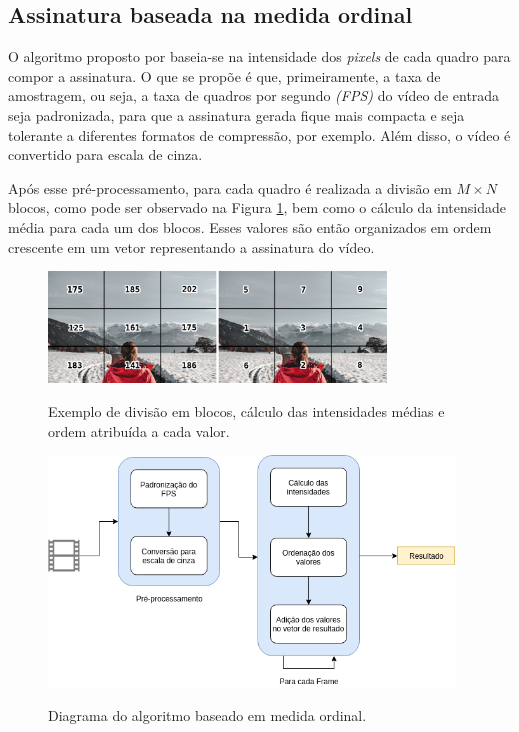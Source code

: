 %
%
\subsection{Assinatura baseada na medida ordinal}
\label{sec:med_ordinal}

	O algoritmo proposto por \citeauthor{hua2004robust} baseia-se na intensidade dos \textit{pixels} de cada quadro para compor a assinatura. O que se propõe é que, primeiramente, a taxa de amostragem, ou seja, a taxa de quadros por segundo \textit{(FPS)} do vídeo de entrada seja padronizada, para que a assinatura gerada fique mais compacta e seja tolerante a diferentes formatos de compressão, por exemplo. Além disso, o vídeo é convertido para escala de cinza.

Após esse pré-processamento, para cada quadro é realizada a divisão em $M \times N$ blocos, como pode ser observado na Figura \ref{fig:medidaord}, bem como o cálculo da intensidade média para cada um dos blocos. Esses valores são então organizados em ordem crescente em um vetor representando a assinatura do vídeo.

	\begin{figure}[!htb]
        \centering
        \caption{Exemplo de divisão em blocos, cálculo das intensidades médias e ordem atribuída a cada valor.}
        \includegraphics[width=0.8\textwidth]{dados/figuras/mo_final.png}
        \label{fig:medidaord}
    \end{figure}

 \begin{figure}[!htb]
      \centering
      \caption{Diagrama do algoritmo baseado em medida ordinal.}
      \includegraphics[width=0.96\textwidth]{dados/figuras/MedidaOrdinal.png}
       	\label{fig:dia_ordinal}
    \end{figure}  

